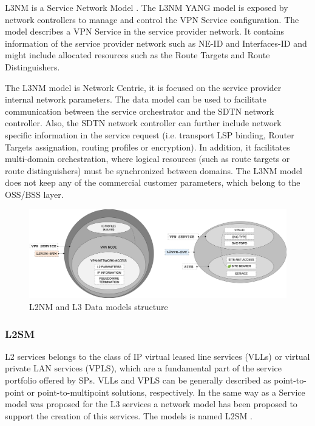 \documentclass[a4paper,fleqn]{cas-dc}
\begin{document}
L3NM is a Service Network Model \cite{voyer2019internet}. The L3NM YANG model is exposed by network controllers to manage and control the VPN Service configuration. The model describes a VPN Service in the service provider network. It contains information of the service provider network such as NE-ID and Interfaces-ID and might include allocated resources such as the Route Targets and Route Distinguishers.

The L3NM model is Network Centric, it is focused on the service provider internal network parameters. The data model can be used to facilitate communication between the service orchestrator and the SDTN network controller. Also, the SDTN network controller can further include network specific information in the service request (i.e. transport LSP binding, Router Targets assignation, routing profiles or encryption). In addition, it facilitates multi-domain orchestration, where logical resources (such as route targets or route distinguishers) must be synchronized between domains.
The L3NM model does not keep any of the commercial customer parameters, which belong to the OSS/BSS layer.

\begin{figure}
	\centering
		\includegraphics[scale=0.35]{figs/L3NM_L2NM.png}
	\caption{L2NM and L3 Data models structure}
	\label{FIG:l3nm} 
\end{figure}

\subsubsection{L2SM}
\label{section:l2nm}

L2 services belongs to the class of IP virtual leased line services (VLLs) or virtual private LAN services (VPLS)\cite{andersson2006framework}, which are a fundamental part of the service portfolio offered by SPs. 
VLLs and VPLS can be generally described as point-to-point or point-to-multipoint solutions, respectively. In the same way as a Service model was proposed for the L3 services a network model has been proposed to support the creation of this services. The models is named L2SM \cite{wen2018yang}. 
\end{document}
